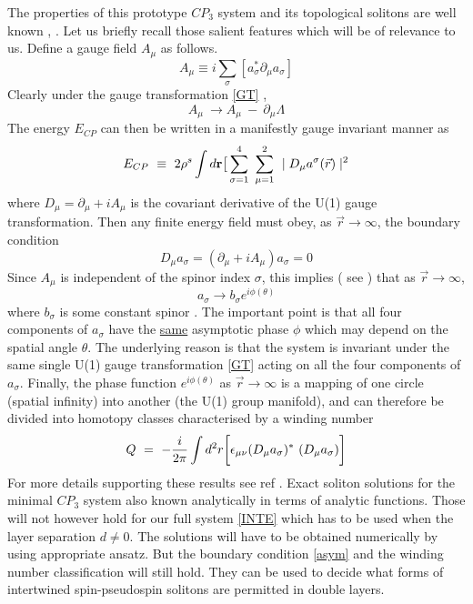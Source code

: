The properties of this prototype $CP_3$ system and its topological
solitons are well known \cite{CP},
\cite{Raj}. Let us briefly recall those salient features which will be of
relevance to us. 
Define a gauge field $A_{\mu}$ as follows.
\begin{equation} A_{\mu} \equiv i \sum_{\sigma} [a_{\sigma}^{*} \partial_{\mu} 
a_{\sigma} ] \end{equation}
Clearly under the gauge transformation \ref{GT} ,
\begin{equation} A_{\mu} \  \rightarrow A_{\mu} \ - \  \partial_{\mu} \Lambda \end{equation}
The energy $E_{CP}$ can then be written in a manifestly
gauge invariant manner as
\begin{equation} E_{CP} \ \equiv \ 2\rho^{s} \int d{\bf r} \big{[}
\sum_{\sigma=1}^{4} \ \sum_{\mu=1}^{2} \ \mid D_{\mu}a^{\sigma} (\vec{r})
\mid^{2} \end{equation}
 where
$D_{\mu} = \partial_{\mu} + i A_{\mu}$ is the covariant derivative of the
U(1) gauge transformation.
Then any finite energy field must obey, as ${\vec{r}} \rightarrow \infty$,
the boundary condition
\begin{equation} D_{\mu}a_{\sigma} = (\partial_{\mu} + i A_{\mu})a_{\sigma} = 0 \end{equation}
Since $A_{\mu}$ is independent of the spinor index $\sigma$, this 
implies ( see \cite{Raj}) that as ${\vec{r}} \rightarrow \infty$,
\begin{equation} a_{\sigma} \rightarrow b_{\sigma} e^{i\phi(\theta)} \label{asym}\end{equation}
where $b_{\sigma}$ is some constant spinor . The important point is that 
all four components of $a_{\sigma}$ have the \underline{same} asymptotic
phase $\phi$ which may depend on the spatial angle $\theta$. The underlying
reason is that the system is invariant under the same single U(1) gauge
transformation \ref{GT} acting on all the four components of $a_{\sigma}$.
Finally, the phase function $e^{i\phi(\theta)}$ as 
${\vec{r}} \rightarrow \infty$
is a mapping of one circle (spatial infinity) into another (the U(1)
group manifold), and can therefore be divided into homotopy classes
characterised by a winding number
\begin{equation} Q \ = \ -{i \over 2\pi} \int d^{2}r \bigg[ \epsilon_{\mu\nu}
(D_{\mu} a_{\sigma}) ^{*} \ (D_{\mu} a_{\sigma}) \bigg] \label{Q} \end{equation}
For more details supporting these results see ref \cite{Raj}.
Exact soliton solutions for the minimal $CP_{3}$ system
also known analytically
in terms of analytic functions. Those will not however hold for our full
system \ref{INTE} which has to be used when the layer
separation $d \neq 0$. The solutions will have to be obtained numerically
by using appropriate ansatz. But the boundary condition \ref{asym} and
the winding number classification will still hold. They can be used to decide
what forms of intertwined spin-pseudospin solitons are permitted in
double layers.

